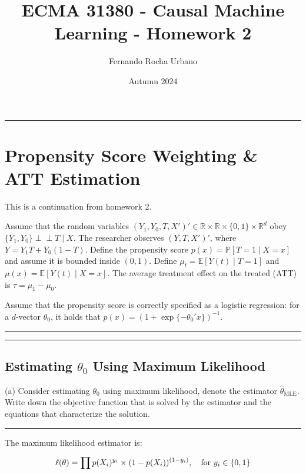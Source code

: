 \documentclass{article}
\title{ECMA 31380 - Causal Machine Learning - Homework 2}
\author{Fernando Rocha Urbano}
\date{Autumn 2024}
\newenvironment{colorparagraph}[1]{\par\color{#1}}{\par}
\begin{document}
\maketitle

\begin{colorparagraph}{questioncolor}
\rule{\textwidth}{0.5pt}
\label{q1}
\section{Propensity Score Weighting \& ATT Estimation}

This is a continuation from homework 2.

Assume that the random variables \((Y_1, Y_0, T, X')' \in \mathbb{R} \times \mathbb{R} \times \{0, 1\} \times \mathbb{R}^d\) obey \(\{Y_1, Y_0\} \perp\!\!\!\perp T \mid X\).
The researcher observes \((Y, T, X')'\), where \( Y = Y_1 T + Y_0 (1 - T) \).
Define the propensity score \( p(x) = \mathbb{P}[T = 1 \mid X = x] \) and assume it is bounded inside \( (0, 1) \).
Define \( \mu_t = \mathbb{E}[Y(t) \mid T = 1] \) and \( \mu(x) = \mathbb{E}[Y(t) \mid X = x] \).
The average treatment effect on the treated (ATT) is \( \tau = \mu_1 - \mu_0 \).

Assume that the propensity score is correctly specified as a logistic regression: for a \( d \)-vector \( \theta_0 \), it holds that \( p(x) = (1 + \exp\{-\theta_0' x\})^{-1} \).

\rule{\textwidth}{0.5pt}
\end{colorparagraph}

\begin{colorparagraph}{questioncolor}
\label{q1a}
\rule{\textwidth}{0.5pt}
\subsection{Estimating \( \theta_0 \) Using Maximum Likelihood}
(a) Consider estimating \( \theta_0 \) using maximum likelihood, denote the estimator \( \hat{\theta}_{\text{MLE}} \).
Write down the objective function that is solved by the estimator and the equations that characterize the solution.

\rule{\textwidth}{0.5pt}
\end{colorparagraph}

The maximum likelihood estimator is:

$$
\ell(\theta) = \prod p(X_i)^{y_i} \times (1 - p(X_i))^{(1 - y_i)}, \quad \text{for} \\\ y_i \in \{ 0, 1 \}
$$
\end{document}
